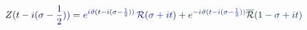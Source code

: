 \documentclass[12pt]{article}
\begin{document}
\makeatletter
\renewcommand*{\@textcolor}[3]{%
  \protect\leavevmode
  \begingroup
    \color#1{#2}#3%
  \endgroup
}
\makeatother
\begin{displaymath}
\mathcolor[RGB]{0,0,15}{Z} \mathcolor[RGB]{0,0,30}{(} \mathcolor[RGB]{0,0,45}{t} \mathcolor[RGB]{0,0,60}{-} \mathcolor[RGB]{0,0,75}{i} \mathcolor[RGB]{0,0,90}{(} \mathcolor[RGB]{0,0,105}{\sigma} \mathcolor[RGB]{0,0,120}{-} \mathcolor[RGB]{0,0,135}{\frac { \mathcolor[RGB]{0,0,150}{1} } { \mathcolor[RGB]{0,0,165}{2} } } \mathcolor[RGB]{0,0,180}{)} \mathcolor[RGB]{0,0,195}{)} \mathcolor[RGB]{0,0,210}{=} \mathcolor[RGB]{0,0,225}{e} ^ { \mathcolor[RGB]{0,0,240}{i} \mathcolor[RGB]{0,0,255}{\vartheta} \mathcolor[RGB]{0,15,0}{(} \mathcolor[RGB]{0,15,15}{t} \mathcolor[RGB]{0,15,30}{-} \mathcolor[RGB]{0,15,45}{i} \mathcolor[RGB]{0,15,60}{(} \mathcolor[RGB]{0,15,75}{\sigma} \mathcolor[RGB]{0,15,90}{-} \mathcolor[RGB]{0,15,105}{\frac { \mathcolor[RGB]{0,15,120}{1} } { \mathcolor[RGB]{0,15,135}{2} } } \mathcolor[RGB]{0,15,150}{)} \mathcolor[RGB]{0,15,165}{)} } \, \mathcal { \mathcolor[RGB]{0,15,180}{R} } \mathcolor[RGB]{0,15,195}{(} \mathcolor[RGB]{0,15,210}{\sigma} \mathcolor[RGB]{0,15,225}{+} \mathcolor[RGB]{0,15,240}{i} \mathcolor[RGB]{0,15,255}{t} \mathcolor[RGB]{0,30,0}{)} \mathcolor[RGB]{0,30,15}{+} \mathcolor[RGB]{0,30,30}{e} ^ { \mathcolor[RGB]{0,30,45}{-} \mathcolor[RGB]{0,30,60}{i} \mathcolor[RGB]{0,30,75}{\vartheta} \mathcolor[RGB]{0,30,90}{(} \mathcolor[RGB]{0,30,105}{t} \mathcolor[RGB]{0,30,120}{-} \mathcolor[RGB]{0,30,135}{i} \mathcolor[RGB]{0,30,150}{(} \mathcolor[RGB]{0,30,165}{\sigma} \mathcolor[RGB]{0,30,180}{-} \mathcolor[RGB]{0,30,195}{\frac { \mathcolor[RGB]{0,30,210}{1} } { \mathcolor[RGB]{0,30,225}{2} } } \mathcolor[RGB]{0,30,240}{)} \mathcolor[RGB]{0,30,255}{)} } \mathcolor[RGB]{0,45,0}{\overline { { \mathcal { \mathcolor[RGB]{0,45,15}{R} } } } } \mathcolor[RGB]{0,45,30}{(} \mathcolor[RGB]{0,45,45}{1} \mathcolor[RGB]{0,45,60}{-} \mathcolor[RGB]{0,45,75}{\sigma} \mathcolor[RGB]{0,45,90}{+} \mathcolor[RGB]{0,45,105}{i} \mathcolor[RGB]{0,45,120}{t} \mathcolor[RGB]{0,45,135}{)}
\end{displaymath}
\end{document}
